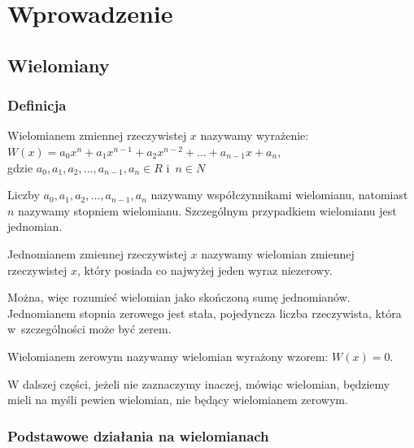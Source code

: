 \chapter{Wprowadzenie}

\section{Wielomiany}

\subsection{Definicja}

\begin{definition}
	$ $\\
	Wielomianem zmiennej rzeczywistej $x$ nazywamy wyrażenie: \\
	$W(x) = a_0x^n + a_1x^{n-1} + a_2x^{n-2}+ ... + a_{n-1}x + a_n$, \\
	gdzie $a_0, a_1, a_2, ..., a_{n-1}, a_n\in R$ i~$n \in N$
\end{definition}

Liczby $a_0, a_1, a_2, ..., a_{n-1}, a_n$ nazywamy współczynnikami wielomianu, natomiast $n$ nazywamy stopniem wielomianu. Szczególnym przypadkiem wielomianu jest jednomian. 

\begin{definition}
	$ $\\
	Jednomianem zmiennej rzeczywistej $x$ nazywamy wielomian zmiennej rzeczywistej $x$, który posiada co najwyżej jeden wyraz niezerowy.
\end{definition}

Można, więc rozumieć wielomian jako skończoną sumę jednomianów.
Jednomianem stopnia zerowego jest stała, pojedyncza liczba rzeczywista, która w~szczególności może być zerem.

\begin{definition}
	$ $\\
	Wielomianem zerowym nazywamy wielomian wyrażony wzorem:	$W(x) = 0$.
\end{definition}

W dalszej części, jeżeli nie zaznaczymy inaczej, mówiąc wielomian, będziemy mieli na myśli pewien wielomian, nie będący wielomianem zerowym.

\subsection{Podstawowe działania na wielomianach}

